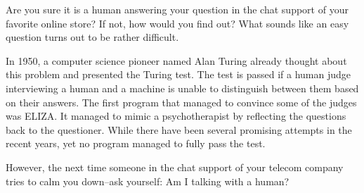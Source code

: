 
Are you sure it is a human answering your question in the chat support of your favorite online store? If not, how would you find out? What sounds like an easy question turns out to be rather difficult. 

In 1950, a computer science pioneer named Alan Turing already thought about this problem and presented the Turing test. The test is passed if a human judge interviewing a human and a machine is unable to distinguish between them based on their answers. The first program that managed to convince some of the judges was ELIZA. It managed to mimic a psychotherapist by reflecting the questions back to the questioner. While there have been several promising attempts in the recent years, yet no program managed to fully pass the test.

However, the next time someone in the chat support of your telecom company tries to calm you down--ask yourself: Am I talking with a human?
